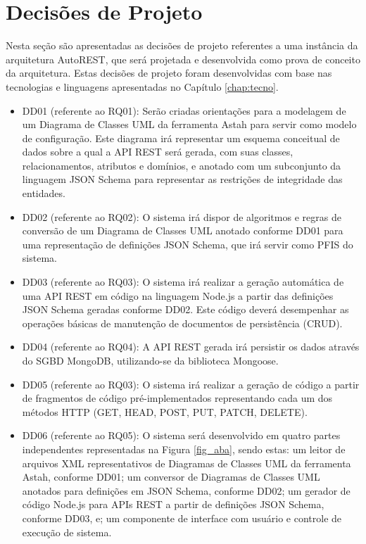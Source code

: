 
\section{Decisões de Projeto}
\label{sec:dds}

Nesta seção são apresentadas as decisões de projeto referentes a uma instância da arquitetura AutoREST, que será projetada e desenvolvida como prova de conceito da arquitetura. Estas decisões de projeto foram desenvolvidas com base nas tecnologias e linguagens apresentadas no Capítulo \ref{chap:tecno}.

\begin{itemize}
    \item DD01 (referente ao RQ01): Serão criadas orientações para a modelagem de um Diagrama de Classes UML da ferramenta Astah para servir como modelo de configuração. Este diagrama irá representar um esquema conceitual de dados sobre a qual a API REST será gerada, com suas classes, relacionamentos, atributos e domínios, e anotado com um subconjunto da linguagem JSON Schema para representar as restrições de integridade das entidades.
    \item DD02 (referente ao RQ02): O sistema irá dispor de algoritmos e regras de conversão de um Diagrama de Classes UML anotado conforme DD01 para uma representação de definições JSON Schema, que irá servir como PFIS do sistema.
    \item DD03 (referente ao RQ03): O sistema irá realizar a geração automática de uma API REST em código na linguagem Node.js a partir das definições JSON Schema geradas conforme DD02. Este código deverá desempenhar as operações básicas de manutenção de documentos de persistência (CRUD).
    \item DD04 (referente ao RQ04): A API REST gerada irá persistir os dados através do SGBD MongoDB, utilizando-se da biblioteca Mongoose.
    \item DD05 (referente ao RQ03): O sistema irá realizar a geração de código a partir de fragmentos de código pré-implementados representando cada um dos métodos HTTP (GET, HEAD, POST, PUT, PATCH, DELETE).
    \item DD06 (referente ao RQ05): O sistema será desenvolvido em quatro partes independentes representadas na Figura \ref{fig_aba}, sendo estas: um leitor de arquivos XML representativos de Diagramas de Classes UML da ferramenta Astah, conforme DD01; um conversor de Diagramas de Classes UML anotados para definições em JSON Schema, conforme DD02; um gerador de código Node.js para APIs REST a partir de definições JSON Schema, conforme DD03, e; um componente de interface com usuário e controle de execução de sistema.
\end{itemize}

